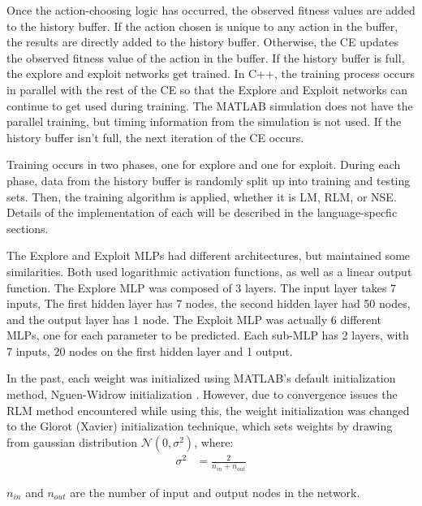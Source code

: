 \par Once the action-choosing logic has occurred, the observed fitness values are added to the history buffer. If the action chosen is unique to any action in the buffer, the results are directly added to the history buffer. Otherwise, the CE updates the observed fitness value of the action in the buffer. If the history buffer is full, the explore and exploit networks get trained. In C++, the training process occurs in parallel with the rest of the CE so that the Explore and Exploit networks can continue to get used during training. The MATLAB simulation does not have the parallel training, but timing information from the simulation is not used. If the history buffer isn't full, the next iteration of the CE occurs.
\par Training occurs in two phases, one for explore and one for exploit. During each phase, data from the history buffer is randomly split up into training and testing sets. Then, the training algorithm is applied, whether it is LM, RLM, or NSE. Details of the implementation of each will be described in the language-specfic sections. 
\par The Explore and Exploit MLPs had different architectures, but maintained some similarities. Both used logarithmic activation functions, as well as a linear output function. The Explore MLP was composed of 3 layers. The input layer takes 7 inputs, The first hidden layer has 7 nodes, the second hidden layer had 50 nodes, and the output layer has 1 node. The Exploit MLP was actually 6 different MLPs, one for each parameter to be predicted. Each sub-MLP has 2 layers, with 7  inputs, 20 nodes on the first hidden layer and 1 output. 
\par In the past, each weight was initialized using MATLAB's default initialization method, Nguen-Widrow initialization \cite{placeholderCitation}. However, due to convergence issues the RLM method encountered while using this, the weight initialization was changed to the Glorot (Xavier) initialization technique\cite{glorot_training}, which sets weights by drawing from gaussian distribution $\mathcal{N}(0,\sigma^2)$, where:
\begin{align*}
	\sigma^2 &= \frac{2}{n_{in}+n_{out}}
\end{align*} 
\par $n_{in}$ and $n_{out}$ are the number of input and output nodes in the network.
